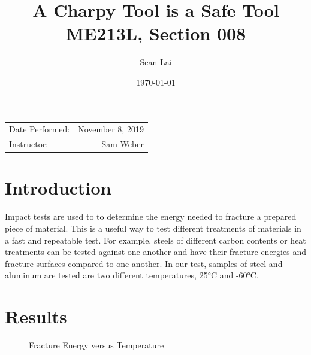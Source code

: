 \documentclass{article}
\title{A Charpy Tool is a Safe Tool \\ ME213L, Section 008}
\author{Sean Lai} %
\date{\today} %
\begin{document}
\raggedright
\maketitle %

\begin{center}
\begin{tabular}{l r}
Date Performed: & November 8, 2019 \\ %

Instructor: & Sam Weber %
\end{tabular}
\end{center}


\section{Introduction}
Impact tests are used to to determine the energy needed to fracture a prepared piece of material. This is a useful way to test different treatments of materials in a fast and repeatable test. For example, steels of different carbon contents or heat treatments can be tested against one another and have their fracture energies and fracture surfaces compared to one another. In our test, samples of steel and aluminum are tested are two different temperatures, \ang{25}C and \ang{-60}C.
\section{Results}
\begin{figure}[H]
	\begin{center}
	\caption{Fracture Energy versus Temperature}
	\label{tab:graph4}
	\end{center}
\end{figure}
\end{document}
